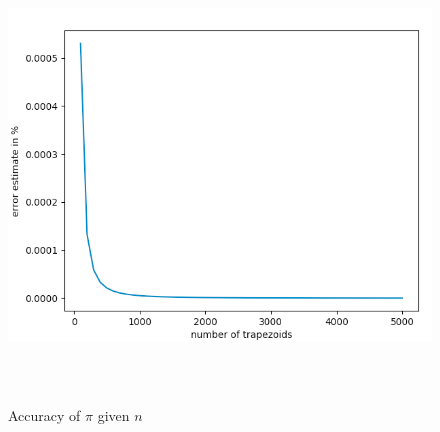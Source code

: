 \documentclass[a4paper]{article}
\begin{document}
\begin{figure}[h]
\caption{Accuracy of $\pi$ given $n$}
\centering
\includegraphics[width=12cm, height=12cm]{pi_percent_error}
\end{figure}
\end{document}
